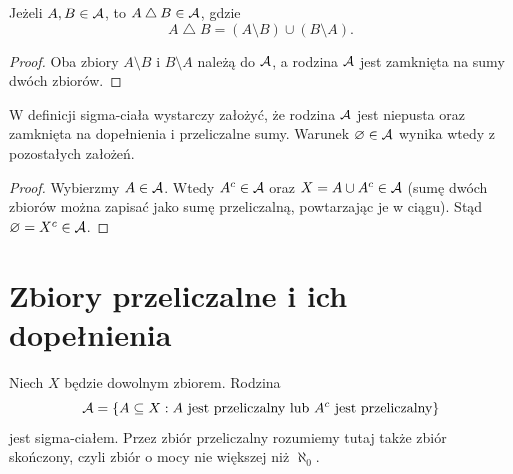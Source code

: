 \begin{fakt}
Jeżeli $A,B\in\mathcal{A}$, to $A\mathbin{\triangle}B\in\mathcal{A}$, gdzie
\[
  A\mathbin{\triangle}B=(A\setminus B)\cup(B\setminus A).
\]
\end{fakt}

\begin{proof}
Oba zbiory $A\setminus B$ i $B\setminus A$ należą do $\mathcal{A}$, a rodzina
$\mathcal{A}$ jest zamknięta na sumy dwóch zbiorów.
\end{proof}

\begin{uwaga}
W definicji sigma-ciała wystarczy założyć, że rodzina $\mathcal{A}$ jest niepusta
oraz zamknięta na dopełnienia i przeliczalne sumy.
Warunek $\varnothing\in\mathcal{A}$ wynika wtedy z pozostałych założeń.
\end{uwaga}

\begin{proof}
Wybierzmy $A\in\mathcal{A}$. Wtedy $A^c\in\mathcal{A}$ oraz
$X=A\cup A^c\in\mathcal{A}$ (sumę dwóch zbiorów można zapisać jako sumę
przeliczalną, powtarzając je w ciągu). Stąd $\varnothing=X^c\in\mathcal{A}$.
\end{proof}

\section{Zbiory przeliczalne i ich dopełnienia}
\label{sec:przeliczalne-dopelnienia}

\begin{przyklad}
Niech $X$ będzie dowolnym zbiorem. Rodzina
\begin{equation}
  \mathcal{A}=\{A\subseteq X:
    A\text{ jest przeliczalny lub }A^c\text{ jest przeliczalny}\}
  \label{eq:sigma-cialo-przeliczalne}
\end{equation}
jest sigma-ciałem. Przez zbiór przeliczalny rozumiemy tutaj także zbiór
skończony, czyli zbiór o mocy nie większej niż $\aleph_0$.
\end{przyklad}

